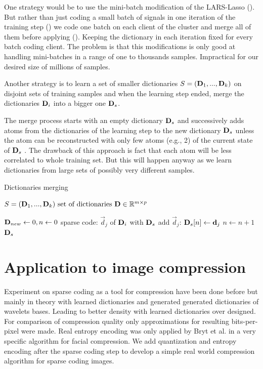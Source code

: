 One strategy would be to use the mini-batch
modification of the LARS-Lasso (). But rather
than just coding a small batch of signals in one iteration of the training
step () we code one batch on each client of the cluster
and merge all of them before applying (). Keeping the
dictionary in each iteration fixed for every batch coding client. The problem is
that this modifications is only good at handling mini-batches in a range of one
to thousands samples. Impractical for our desired size of millions of samples.

Another strategy is to learn a set of smaller dictionaries $S =
(\boldsymbol{\mathrm{D}}_1, ..., \boldsymbol{\mathrm{D}}_k)$ on disjoint sets of training samples and when
the learning step ended, merge the dictionaries $\boldsymbol{\mathrm{D}}_i$ into a bigger one
$\boldsymbol{\mathrm{D}}_{s}$. 

The merge process starts with an empty dictionary $\boldsymbol{\mathrm{D}}_{s}$  and
successively adds atoms from the dictionaries of the learning step to the new
dictionary $\boldsymbol{\mathrm{D}}_{s}$  unless the atom can be reconstructed with only few
atoms (e.g., 2) of the current state of $\boldsymbol{\mathrm{D}}_{s}$ . The drawback of this
approach is fact that  each atom will be less correlated to whole training set.
But this will happen anyway as we learn dictionaries from large sets of possibly
very different samples. 

\begin{algorithm}[H]
\caption{Dictionaries merging}
\label{alg:merging}
\begin{algorithmic}[1]
\REQUIRE $ S = (\boldsymbol{\mathrm{D}}_1, ..., \boldsymbol{\mathrm{D}}_k) \text{ set of dictionaries } \boldsymbol{\mathrm{D}}
\in \mathbb{R}^{m\times p}$

\STATE $\boldsymbol{\mathrm{D}}_{new} \gets 0, n \gets 0$
\STATE sparse code: $\vec{d}_j$ of $\boldsymbol{\mathrm{D}}_i$ with $\boldsymbol{\mathrm{D}}_{s}$
\STATE add $\vec{d}_j$: $\boldsymbol{\mathrm{D}}_{s}[n] \gets \boldsymbol{\mathrm{d}}_{j}$
\STATE $n \gets n+1$
\ENDIF
\ENDFOR
\ENDFOR
\RETURN $\boldsymbol{\mathrm{D}}_s$
\end{algorithmic}
\end{algorithm}



\section{Application to image compression}
\label{sec:compression}
Experiment on sparse coding as a tool for compression have been done
before\cite{Lewicki1999,Murray2006} but mainly in theory with learned
dictionaries and generated generated dictionaries of wavelets bases. Leading to
better density with learned dictionaries over designed. For comparison of
compression quality only approximations for resulting bits-per-pixel were
made. Real entropy encoding was only applied by Bryt et al.\cite{Bryt2008} in
a very specific algorithm for facial compression. We add quantization and
entropy encoding after the sparse coding step to develop a simple real world
compression algorithm for sparse coding images.

